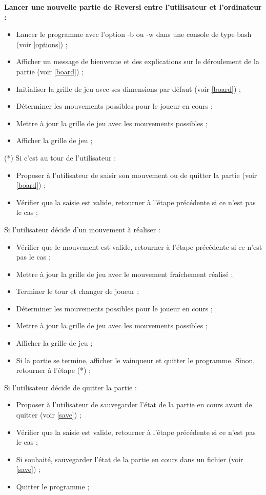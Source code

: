 \documentclass[10pt,a4paper]{article}
\begin{document}
\textbf{Lancer une nouvelle partie de Reversi entre l'utilisateur et l'ordinateur :}\\
\begin{itemize}
\item Lancer le programme avec l'option -b ou -w dans une console de type bash (voir \ref{options}) ;
\item Afficher un message de bienvenue et des explications sur le déroulement de la partie (voir \ref{board}) ;\\
\item Initialiser la grille de jeu avec ses dimensions par défaut (voir \ref{board}) ;
\item Déterminer les mouvements possibles pour le joueur en cours ;
\item Mettre à jour la grille de jeu avec les mouvements possibles ;
\item Afficher la grille de jeu ;\\
\end{itemize}
(*) Si c'est au tour de l'utilisateur :
\begin{itemize}
\item Proposer à l'utilisateur de saisir son mouvement ou de quitter la partie (voir \ref{board}) ;
\item Vérifier que la saisie est valide, retourner à l'étape précédente si ce n'est pas le cas ;
\end{itemize}
Si l'utilisateur décide d'un mouvement à réaliser :
\begin{itemize}
\item Vérifier que le mouvement est valide, retourner à l'étape précédente si ce n'est pas le cas ;
\item Mettre à jour la grille de jeu avec le mouvement fraîchement réalisé ;
\item Terminer le tour et changer de joueur ;
\item Déterminer les mouvements possibles pour le joueur en cours ;
\item Mettre à jour la grille de jeu avec les mouvements possibles ;
\item Afficher la grille de jeu ;
\item Si la partie se termine, afficher le vainqueur et quitter le programme.
Sinon, retourner à l'étape (*) ;\\
\end{itemize}
Si l'utilisateur décide de quitter la partie :
\begin{itemize}
\item Proposer à l'utilisateur de sauvegarder l'état de la partie en cours avant de quitter (voir \ref{save}) ;
\item Vérifier que la saisie est valide, retourner à l'étape précédente si ce n'est pas le cas ;
\item Si souhaité, sauvegarder l'état de la partie en cours dans un fichier (voir \ref{save}) ;
\item Quitter le programme ;\\
\end{itemize}
\end{document}
